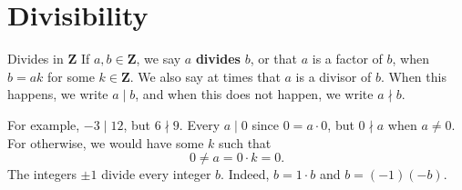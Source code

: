 \section{Divisibility}
\begin{Definition}{Divides in $ \mathbf{Z} $}{}
    If $ a,b\in\mathbf{Z} $, we say $ a $ \textbf{divides} $ b $, or that $ a $
    is a factor of $ b $, when $ b=ak $ for some $ k\in\mathbf{Z} $. We also say at times
    that $ a $ is a divisor of $ b $. When this happens, we write $ a\mid b $, and
    when this does not happen, we write $ a\nmid b $.
\end{Definition}
\begin{Example}{}{}
    For example, $ -3\mid 12 $, but $ 6\nmid 9 $. Every $ a\mid 0 $ since $ 0=a\cdot 0 $,
    but $ 0\nmid a $ when $ a\ne 0 $. For otherwise, we would have some $ k $ such that
    \[ 0\ne a=0\cdot k=0. \]
    The integers $ \pm 1 $ divide every integer $ b $. Indeed, $ b=1\cdot b $ and $ b=(-1)(-b) $.
\end{Example}
